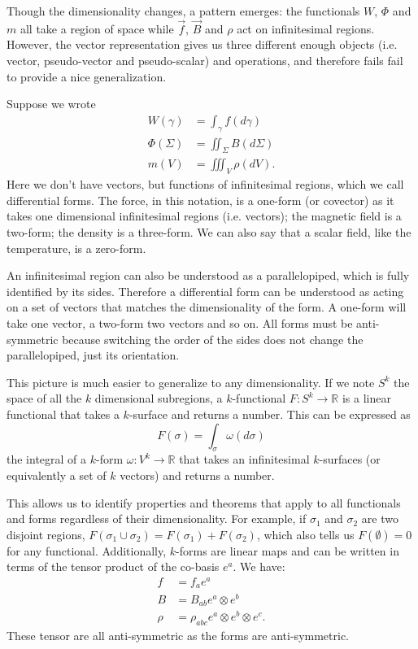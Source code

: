 \documentclass[10pt,twocolumn, nofootinbib]{revtex4-2}
\begin{document}
Though the dimensionality changes, a pattern emerges: the functionals $W$, $\Phi$ and $m$ all take a region of space while $\vec{f}$, $\vec{B}$ and $\rho$ act on infinitesimal regions. However, the vector representation gives us three different enough objects (i.e. vector, pseudo-vector and pseudo-scalar) and operations, and therefore fails fail to provide a nice generalization.

Suppose we wrote
\begin{equation*}
\begin{aligned}
	W(\gamma) &= \int_\gamma f(d\gamma) \\
	\Phi(\Sigma) &= \iint_\Sigma B(d\Sigma) \\
	m(V) &= \iiint_V \rho(dV).
\end{aligned}
\end{equation*}
Here we don't have vectors, but functions of infinitesimal regions, which we call differential forms. The force, in this notation, is a one-form (or covector) as it takes one dimensional infinitesimal regions (i.e. vectors); the magnetic field is a two-form; the density is a three-form. We can also say that a scalar field, like the temperature, is a zero-form.

An infinitesimal region can also be understood as a parallelopiped, which is fully identified by its sides. Therefore a differential form can be understood as acting on a set of vectors that matches the dimensionality of the form. A one-form will take one vector, a two-form two vectors and so on. All forms must be anti-symmetric because switching the order of the sides does not change the parallelopiped, just its orientation.

This picture is much easier to generalize to any dimensionality. If we note $S^k$ the space of all the $k$ dimensional subregions, a $k$-functional $F : S^k \to \mathbb{R}$ is a linear functional that takes a $k$-surface and returns a number. This can be expressed as
\begin{equation*}
	F(\sigma) = \int_\sigma \omega(d\sigma)
\end{equation*}
the integral of a $k$-form $\omega : V^k \to \mathbb{R}$ that takes an infinitesimal $k$-surfaces (or equivalently a set of $k$ vectors) and returns a number.

This allows us to identify properties and theorems that apply to all functionals and forms regardless of their dimensionality. For example, if $\sigma_1$ and $\sigma_2$ are two disjoint regions, $F(\sigma_1 \cup \sigma_2) = F(\sigma_1) + F(\sigma_2)$, which also tells us $F(\emptyset) = 0$ for any functional. Additionally, $k$-forms are linear maps and can be written in terms of the tensor product of the co-basis $e^a$. We have:
\begin{equation*}
	\begin{aligned}
		f &= f_a e^a \\
		B &= B_{ab} e^a \otimes e^b \\
		\rho &= \rho_{abc} e^a \otimes e^b \otimes e^c.
	\end{aligned}
\end{equation*}
These tensor are all anti-symmetric as the forms are anti-symmetric.
\end{document}
